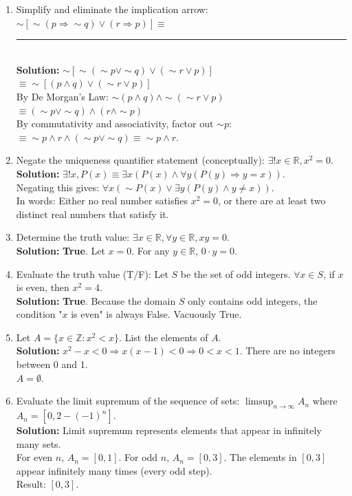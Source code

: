 \documentclass[11pt]{article}
\begin{document}
\begin{enumerate}[label=(\roman*)]
    \item Simplify and eliminate the implication arrow: $\sim[\sim(p \Rightarrow \sim q) \vee (r \Rightarrow p)] \equiv$ \rule{3cm}{0.15mm}\\
    \textbf{Solution:} 
    $\sim[\sim(\sim p \vee \sim q) \vee (\sim r \vee p)]$ \\
    $\equiv \sim[(p \wedge q) \vee (\sim r \vee p)]$ \\
    By De Morgan's Law: $\sim(p \wedge q) \wedge \sim(\sim r \vee p)$ \\
    $\equiv (\sim p \vee \sim q) \wedge (r \wedge \sim p)$ \\
    By commutativity and associativity, factor out $\sim p$: \\
    $\equiv \sim p \wedge r \wedge (\sim p \vee \sim q) \equiv \sim p \wedge r$.

    \item Negate the uniqueness quantifier statement (conceptually): $\exists! x \in \mathbb{R}, x^2 = 0$.\\
    \textbf{Solution:} $\exists! x, P(x) \equiv \exists x (P(x) \wedge \forall y(P(y) \Rightarrow y=x))$. \\
    Negating this gives: $\forall x (\sim P(x) \vee \exists y(P(y) \wedge y \neq x))$. \\
    In words: Either no real number satisfies $x^2=0$, or there are at least two distinct real numbers that satisfy it.

    \item Determine the truth value: $\exists x \in \mathbb{R}, \forall y \in \mathbb{R}, xy = 0$.\\
    \textbf{Solution:} \textbf{True}. Let $x = 0$. For any $y \in \mathbb{R}$, $0 \cdot y = 0$.

    \item Evaluate the truth value (T/F): Let $S$ be the set of odd integers. $\forall x \in S$, if $x$ is even, then $x^2 = 4$.\\
    \textbf{Solution:} \textbf{True}. Because the domain $S$ only contains odd integers, the condition "$x$ is even" is always False. Vacuously True.

    \item Let $A = \{x \in \mathbb{Z} : x^2 < x\}$. List the elements of $A$.\\
    \textbf{Solution:} $x^2 - x < 0 \Rightarrow x(x-1) < 0 \Rightarrow 0 < x < 1$. There are no integers between 0 and 1. \\
    $A = \emptyset$.

    \item Evaluate the limit supremum of the sequence of sets: $\limsup_{n\to\infty} A_n$ where $A_n = [0, 2 - (-1)^n]$.\\
    \textbf{Solution:} Limit supremum represents elements that appear in infinitely many sets. \\
    For even $n$, $A_n = [0, 1]$. For odd $n$, $A_n = [0, 3]$. The elements in $[0, 3]$ appear infinitely many times (every odd step). \\
    Result: $[0, 3]$.
\end{enumerate}
\end{document}
